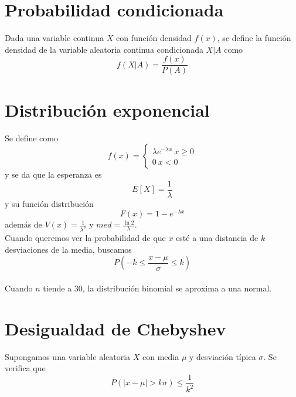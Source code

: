 \documentclass{./Probabilidad.tex}
\begin{document}
\section{Probabilidad condicionada}
Dada una variable continua \(X\) con función densidad \(f(x)\), se define la función densidad de la
variable aleatoria continua condicionada \(X | A\) como
\[
	f(X | A) = \frac{f(x)}{P(A)}
\]
\section{Distribución exponencial}
Se define como
\[
	f(x) =  \left\{\begin{matrix}
		\lambda e^{-\lambda x}~x \geq 0 \\ 0~ x < 0
		\end{matrix}\right.
\]
y se da que la esperanza es
\[
	E[X] = \frac{1}{\lambda }
\]
y su función distribución
\[
	F(x) = 1 -e^{-\lambda x}
\]
además de \(V(x) = \frac{1}{\lambda^{2}}\) y \(med = \frac{\ln 2}{\lambda }\).
\\
Cuando queremos ver la probabilidad de que $x$ esté a una distancia de
$k$ desviaciones de la media, buscamos
\[
	P (-k \leq \frac{x - \mu}{\sigma} \leq k)
\]
\\
Cuando $n$ tiende a $30$, la distribución binomial se aproxima a una normal.  
\section{Desigualdad de Chebyshev}
Supongamos una variable aleatoria $X$ con media $\mu$ y desviación típica
$\sigma$. Se verifica que
\[
	P(|x - \mu| >k \sigma) \leq \frac{1}{k ^{2}} 
\]
\end{document}

